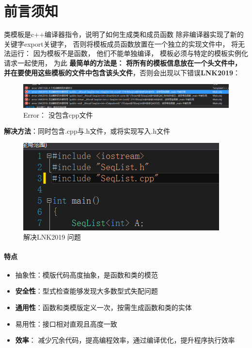 \documentclass[UTF8,a4paper,12pt]{ctexbook}
\begin{document}
\section{前言须知}
	类模板是c++编译器指令，说明了如何生成类和成员函数 除非编译器实现了新的关键字export关键字， 否则将模板成员函数放置在一个独立的实现文件中， 将无法运行： 因为模板不是函数， 他们不能单独编译， 模板必须与特定的模板实例化请求一起使用， 为此 \textbf{最简单的方法是： }\textbf{将所有的模板信息放在一个头文件中， 并在要使用这些模板的文件中包含该头文件}，否则会出现以下错误\textbf{LNK2019}：
	
		\begin{figure}[h]
			\centering
			\includegraphics[width = 14cm]{MustKnowError.png}
			\caption{Error： 没包含cpp文件}
		\end{figure}
		
	\textbf{解决方法}：同时包含.cpp与.h文件，或将实现写入.h文件
		\begin{figure}[h]
			\centering
			\includegraphics[scale = 0.6]{TemplateFirst.png}
			\caption{解决LNK2019 问题}
		\end{figure}	
 
 
	 \paragraph{特点}
		 \begin{itemize}
			 \item 抽象性：模版代码高度抽象，是函数和类的模范
			 \item \textbf{安全性}：型式检查能够发现大多数型式失配问题
			 \item \textbf{通用性}：函数和类模版定义一次，按需生成函数和类的实体
			 \item 易用性：接口相对直观且高度一致
			 \item \textbf{效率}： 减少冗余代码，提高编程效率，通过编译优化，提升程序执行效率
		 \end{itemize}
	
\end{document}
